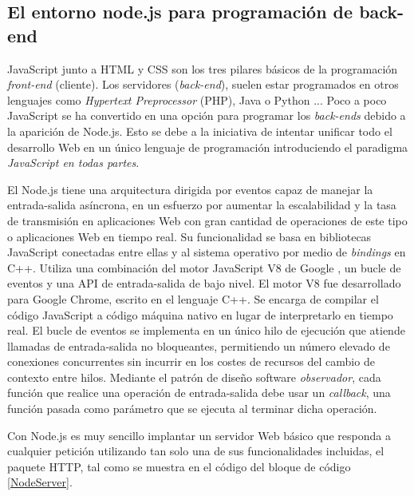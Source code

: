 \subsection{El entorno node.js para programación de back-end }

JavaScript junto a HTML y CSS son los tres pilares básicos de la programación \emph{front-end} (cliente). Los servidores (\emph{back-end}), suelen estar programados en otros lenguajes como \emph{Hypertext Preprocessor} (PHP), Java \cite{JavaServer} o Python \cite{Python}... Poco a poco JavaScript se ha convertido en una opción para programar los \emph{back-ends} debido a la aparición de Node.js.  Esto se debe a la iniciativa de intentar unificar todo el desarrollo Web en un único lenguaje de programación introduciendo el  paradigma \emph{JavaScript en todas partes}.

El Node.js tiene una arquitectura dirigida por eventos capaz de manejar la entrada-salida asíncrona, en un esfuerzo por aumentar la escalabilidad y la tasa de transmisión en aplicaciones Web con gran cantidad de operaciones de este tipo o aplicaciones Web en tiempo real. Su funcionalidad se basa en bibliotecas JavaScript conectadas entre ellas y al sistema operativo por medio de \emph{bindings} en C++. Utiliza una combinación del motor JavaScript V8 de Google \cite{V8}, un bucle de eventos y una API de entrada-salida de bajo nivel. El motor V8 fue desarrollado para Google Chrome, escrito en el lenguaje C++. Se encarga de compilar el código JavaScript a código máquina nativo en lugar de interpretarlo en tiempo real. El bucle de eventos se implementa en un único hilo de ejecución que atiende llamadas de entrada-salida no bloqueantes, permitiendo un número elevado de conexiones concurrentes sin incurrir en los costes de recursos del cambio de contexto entre hilos. Mediante el patrón de diseño software \emph{observador}, cada función que realice una operación de entrada-salida debe usar un \emph{callback}, una función pasada como parámetro que se ejecuta al terminar dicha operación.

Con Node.js es muy sencillo implantar un servidor Web básico que responda a cualquier petición utilizando tan solo una de sus funcionalidades incluidas, el paquete HTTP, tal como se muestra en el código del bloque de código \ref{NodeServer}.


